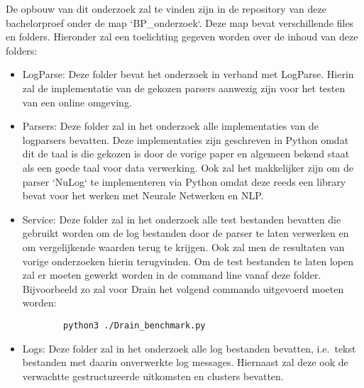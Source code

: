 De opbouw van dit onderzoek zal te vinden zijn in de repository van deze bachelorproef onder de map `BP\_onderzoek`. Deze map bevat verschillende files en folders. Hieronder zal een toelichting gegeven worden over de inhoud van deze folders:
\begin{itemize}
    \item LogParse: Deze folder bevat het onderzoek in verband met LogParse. Hierin zal de implementatie van de gekozen parsers aanwezig zijn voor het testen van een online omgeving.\\
    
    \item Parsers: Deze folder zal in het onderzoek alle implementaties van de logparsers bevatten. Deze implementaties zijn geschreven in Python omdat dit de taal is die gekozen is door de vorige paper en algemeen bekend staat als een goede taal voor data verwerking. Ook zal het makkelijker zijn om de parser `NuLog` te implementeren via Python omdat deze reeds een library bevat voor het werken met Neurale Netwerken en NLP.\\
    
    \item Service: Deze folder zal in het onderzoek alle test bestanden bevatten die gebruikt worden om de log bestanden door de parser te laten verwerken en om vergelijkende waarden terug te krijgen. Ook zal men de resultaten van vorige onderzoeken hierin terugvinden. Om de test bestanden te laten lopen zal er moeten gewerkt worden in de command line vanaf deze folder. Bijvoorbeeld zo zal voor Drain het volgend commando uitgevoerd moeten worden:
    
    \begin{verbatim}
        python3 ./Drain_benchmark.py
    \end{verbatim}

    \item Logs: Deze folder zal in het onderzoek alle log bestanden bevatten, i.e.\ tekst bestanden met daarin onverwerkte log messages. Hiernaast zal deze ook de verwachtte gestructureerde uitkomsten en clusters bevatten.
\end{itemize}

